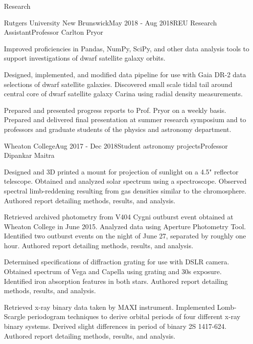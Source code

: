 \documentclass{resume} %
\begin{document}
\begin{rSection}{Research}
\begin{rSubsection}{Rutgers University New Brunswick}{May 2018 - Aug 2018}{REU Research Assistant}{Professor Carlton Pryor}
\item Improved proficiencies in Pandas, NumPy, SciPy, and other data analysis tools to support investigations of dwarf satellite galaxy orbits.
\item Designed, implemented, and modified data pipeline for use with Gaia DR-2 data selections of dwarf satellite galaxies. Discovered small scale tidal tail around central core of dwarf satellite galaxy Carina using radial density measurements.
\item Prepared and presented progress reports to Prof. Pryor on a weekly basis. Prepared and delivered final presentation at summer research symposium and to professors and graduate students of the physics and astronomy department.
\end{rSubsection}


\begin{rSubsection}{Wheaton College}{Aug 2017 - Dec 2018}{Student astronomy projects}{Professor Dipankar Maitra}
\item Designed and 3D printed a mount for projection of sunlight on a 4.5" reflector telescope. Obtained and analyzed solar spectrum using a spectroscope. Observed spectral limb-reddening resulting from gas densities similar to the chromosphere. Authored report detailing methods, results, and analysis.
\item Retrieved archived photometry from V404 Cygni outburst event obtained at Wheaton College in June 2015. Analyzed data using Aperture Photometry Tool. Identified two outburst events on the night of June 27, separated by roughly one hour. Authored report detailing methods, results, and analysis.
\item Determined specifications of diffraction grating for use with DSLR camera. Obtained spectrum of Vega and Capella using grating and 30s exposure. Identified iron absorption features in both stars. Authored report detailing methods, results, and analysis.
\item Retrieved x-ray binary data taken by MAXI instrument. Implemented Lomb-Scargle periodogram techniques to derive orbital periods of four different x-ray binary systems. Derived slight differences in period of binary 2S 1417-624. Authored report detailing methods, results, and analysis.
\end{rSubsection}


\end{rSection}
\end{document}
